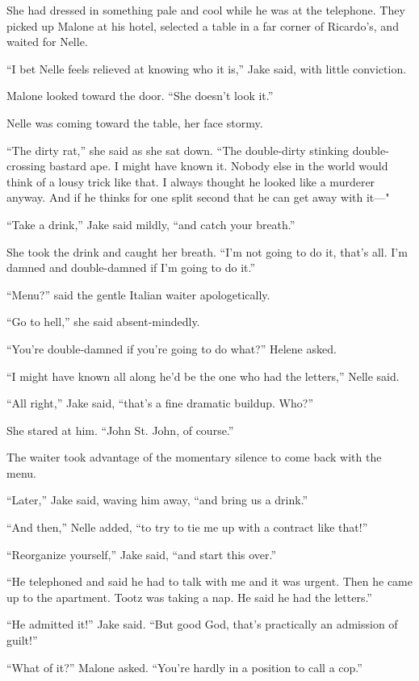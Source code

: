 \documentclass{novel}
\begin{document}
She had dressed in something pale and cool while he was at the telephone. They picked up Malone at his hotel, selected a table in a far corner of Ricardo’s, and waited for Nelle.

“I bet Nelle feels relieved at knowing who it is,” Jake said, with little conviction.

Malone looked toward the door. “She doesn’t look it.”

Nelle was coming toward the table, her face stormy.

“The dirty rat,” she said as she sat down. “The double-dirty stinking double-crossing bastard ape. I might have known it. Nobody else in the world would think of a lousy trick like that. I always thought he looked like a murderer anyway. And if he thinks for one split second that he can get away with it—"

“Take a drink,” Jake said mildly, “and catch your breath.”

She took the drink and caught her breath. “I'm not going to do it, that’s all. I’m damned and double-damned if I’m going to do it.”

“Menu?” said the gentle Italian waiter apologetically.

“Go to hell,” she said absent-mindedly.

“You’re double-damned if you’re going to do what?” Helene asked.

“I might have known all along he’d be the one who had the letters,” Nelle said.

“All right,” Jake said, “that’s a fine dramatic buildup. Who?”

She stared at him. “John St. John, of course.”

The waiter took advantage of the momentary silence to come back with the menu.

“Later,” Jake said, waving him away, “and bring us a drink.”

“And then,” Nelle added, “to try to tie me up with a contract like that!”

“Reorganize yourself,” Jake said, “and start this over.”

“He telephoned and said he had to talk with me and it was urgent. Then he came up to the apartment. Tootz was taking a nap. He said he had the letters.”

“He admitted it!” Jake said. “But good God, that’s practically an admission of guilt!”

“What of it?” Malone asked. “You’re hardly in a position to call a cop.”
\end{document}
